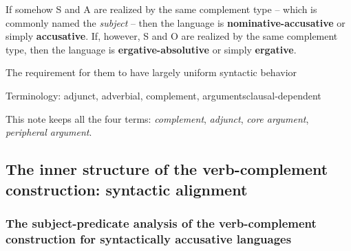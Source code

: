 \documentclass{article}
\newcommand*{\concept}[1]{\textbf{#1}}
\newcommand*{\term}[1]{\emph{#1}}
\begin{document}
If somehow S and A are realized by the same complement type 
-- which is commonly named the \term{subject} --
then the language is \concept{nominative-accusative} or simply \concept{accusative}.
If, however, S and O are realized by the same complement type,
then the language is \concept{ergative-absolutive} or simply \concept{ergative}.



The requirement for them to have largely uniform syntactic behavior 

\begin{infobox}{Terminology: adjunct, adverbial, complement, arguments}{clausal-dependent}
    

    This note keeps all the four terms: \term{complement}, \term{adjunct}, 
    \term{core argument}, \term{peripheral argument}.
\end{infobox}

\subsection{The inner structure of the verb-complement construction: syntactic alignment}

\subsubsection{The subject-predicate analysis of the verb-complement construction for syntactically accusative languages}
\end{document}
